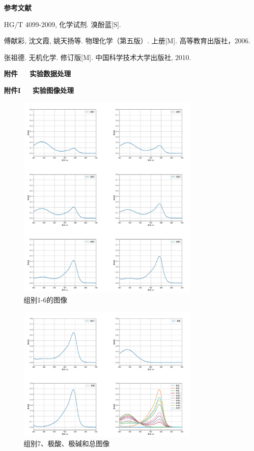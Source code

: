 \documentclass[12pt]{ctexart}
\numberwithin{equation}{section}
\begin{document}
\begin{center}
    \Large\bfseries{参考文献}
\end{center}

\noindent
[1] HG/T 4099-2009, 化学试剂. 溴酚蓝[S].

\noindent
[2] 傅献彩, 沈文霞, 姚天扬等. 物理化学（第五版）. 上册[M].
高等教育出版社，2006.

\noindent
[3] 张祖德. 无机化学. 修订版[M]. 中国科学技术大学出版社, 2010.

\newpage

\begin{center}
    \LARGE\bfseries{附件~~~实验数据处理}
\end{center}

\begin{center}
    \Large\bfseries{附件I~~~实验图像处理}
\end{center}

\begin{figure}[ht]
    \centering
    \includegraphics[width=0.8\textwidth]{inone1.jpeg}
    \caption{组别1-6的图像}
    \label{fig:243}
\end{figure}

\begin{figure}[ht]
    \centering
    \includegraphics[width=0.8\textwidth]{inone2.jpeg}
    \caption{组别7、极酸、极碱和总图像}
    \label{fig:3546}
\end{figure}
\end{document}
